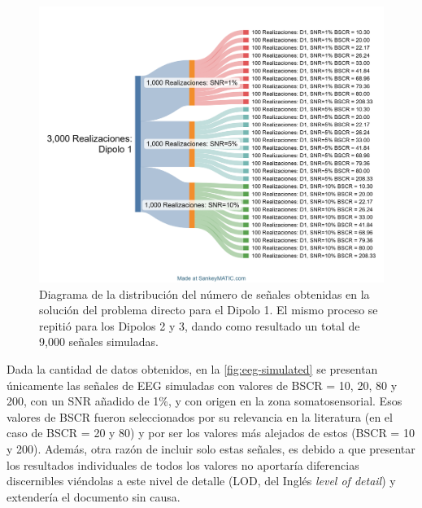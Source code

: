 \begin{figure}[tb]
    \centering
    \includegraphics[width=\textwidth]{gfx/sankey-direct.png}
    \caption{Diagrama de la distribución del número de señales obtenidas en la solución del problema directo para el Dipolo 1. El mismo proceso se repitió para los Dipolos 2 y 3, dando como resultado un total de 9,000 señales simuladas.}
    \label{fig:sankey-direct}
\end{figure}

Dada la cantidad de datos obtenidos, en la \cref{fig:eeg-simulated} se presentan únicamente las señales de EEG simuladas con valores de BSCR = 10, 20, 80 y 200, con un SNR añadido de 1\%, y con origen en la zona somatosensorial. 
Esos valores de BSCR fueron seleccionados por su relevancia en la literatura (en el caso de BSCR = 20 y 80) y por ser los valores más alejados de estos (BSCR = 10 y 200).
Además, otra razón de incluir solo estas señales, es debido a que presentar los resultados individuales de todos los valores no aportaría diferencias discernibles viéndolas a este nivel de detalle (LOD, del Inglés \emph{level of detail}) y extendería el documento sin causa.

